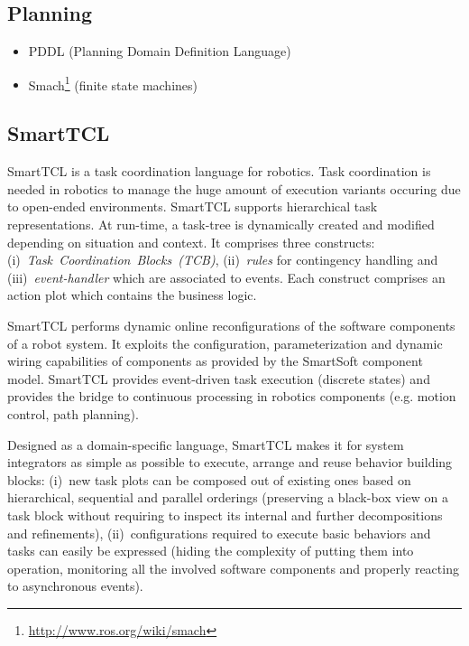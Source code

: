 \documentclass[jou]{apa}
\begin{document}
\subsection{Planning}
\begin{itemize}
\item PDDL (Planning Domain Definition Language)
\item Smach\footnote{\url{http://www.ros.org/wiki/smach}} (finite state machines)
\end{itemize}

\subsection{SmartTCL}

{\sc SmartTCL} \cite{schlegel-smarttcl} is a task coordination language for robotics. Task 
coordination is needed in robotics to manage the huge amount of execution variants occuring 
due to open-ended environments. {\sc SmartTCL} supports hierarchical task representations.
At run-time, a task-tree is dynamically created and modified depending on situation and
context. It comprises three constructs: \mbox{(i) {\em Task Coordination Blocks (TCB)}},
\mbox{(ii) {\em rules}} for contingency handling and \mbox{(iii) {\em event-handler}}
which are associated to events. Each construct comprises an action plot which contains
the business logic.

{\sc SmartTCL} performs dynamic online reconfigurations of the software components of
a robot system. It exploits the configuration, parameterization and dynamic wiring 
capabilities of components as provided by the {\sc SmartSoft} component model.
{\sc SmartTCL} provides event-driven task execution (discrete states) and provides
the bridge to continuous processing in robotics components (e.g. motion control, path
planning).

Designed as a domain-specific language, {\sc SmartTCL} makes it for system integrators 
as simple as possible to execute, arrange and reuse behavior building blocks: \mbox{(i) new}
task plots can be composed out of existing ones based on hierarchical, sequential and parallel 
orderings (preserving a black-box view on a task block without requiring to inspect its internal
and further decompositions and refinements), \mbox{(ii) configurations} required to execute
basic behaviors and tasks can easily be expressed (hiding the complexity of putting them into 
operation, monitoring all the involved software components and properly reacting to asynchronous
events). 
\end{document}
